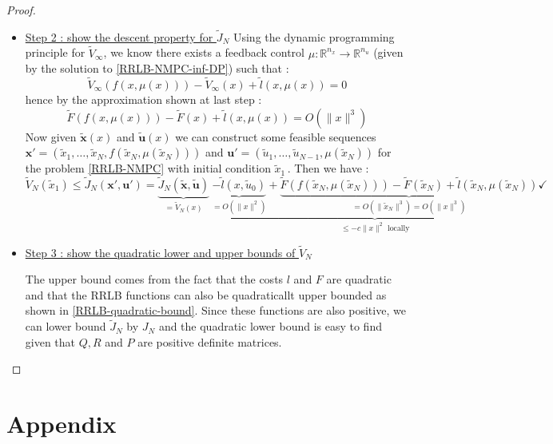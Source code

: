 \documentclass[12pt]{article}
\theoremstyle{definition}
\theoremstyle{remark}
\newcommand{\R}{\mathbb{R}}
\begin{document}
\begin{proof}
\begin{itemize}[label=\textbullet]
		\item \underline{Step 2 : show the descent property for $\tilde{J}_N$} \newline
		Using the dynamic programming principle for $\tilde{V}_\infty$, we know there exists a feedback control $\mu:\R^{n_x}\to\R^{n_u}$ (given by the solution to \ref{RRLB-NMPC-inf-DP}) such that :
		$$\tilde{V}_\infty(f(x,\mu(x)))-\tilde{V}_\infty(x)+\tilde{l}(x,\mu(x))=0$$
		hence by the approximation shown at last step :
		$$\tilde{F}(f(x,\mu(x)))-\tilde{F}(x)+\tilde{l}(x,\mu(x))=O(\|x\|^3)$$
		Now given $\tilde{\mathbf{x}}(x)$ and $\tilde{\mathbf{u}}(x)$ we can construct some feasible sequences $\mathbf{x}'=(\tilde{x}_1,\dots,\tilde{x}_N,f(\tilde{x}_N,\mu(\tilde{x}_N)))$ and $\mathbf{u}'=(\tilde{u}_1,\dots,\tilde{u}_{N-1},\mu(\tilde{x}_N))$ for the problem \ref{RRLB-NMPC} with initial condition $\tilde{x}_1$\,.
		Then we have :
		$$\tilde{V}_N(\tilde{x}_1)\leq\tilde{J}_N(\mathbf{x}',\mathbf{u}')=\underbrace{\tilde{J}_N(\tilde{\mathbf{x}},\tilde{\mathbf{u}})}_{=\tilde{V}_N(x)}~\underbrace{\underbrace{-\tilde{l}(x,\tilde{u}_0)}_{=O(\|x\|^2)}+\underbrace{\tilde{F}(f(\tilde{x}_N,\mu(\tilde{x}_N)))-\tilde{F}(\tilde{x}_N)+\tilde{l}(\tilde{x}_N,\mu(\tilde{x}_N)) }_{=O(\|\tilde{x}_N\|^3)=O(\|x\|^3)} }_{\leq-c\|x\|^2\text{ locally}}\checkmark$$
		
		\item{\underline{Step 3 : show the quadratic lower and upper bounds of $\tilde{V}_N$}}\newline
		
		The upper bound comes from the fact that the costs $l$ and $F$ are quadratic and that the RRLB functions can also be quadraticallt upper bounded as shown in \ref{RRLB-quadratic-bound}.
		Since these functions are also positive, we can lower bound $\tilde{J}_N$ by $J_N$ and the quadratic lower bound is easy to find given that $Q,R$ and $P$ are positive definite matrices.
	\end{itemize}
\end{proof}

\section*{Appendix}
\printbibliography
\end{document}
